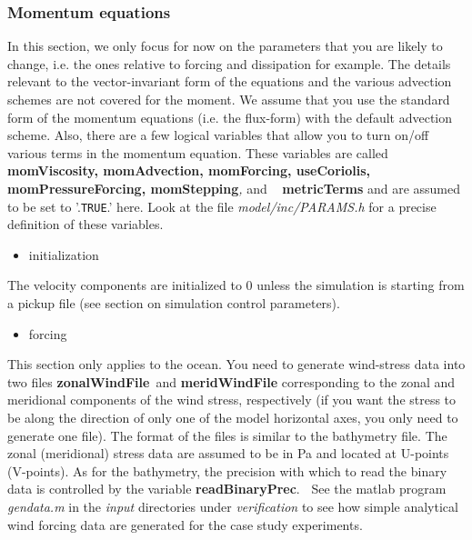 \subsubsection{Momentum equations}

In this section, we only focus for now on the parameters that you are likely
to change, i.e. the ones relative to forcing and dissipation for example.
The details relevant to the vector-invariant form of the equations and the
various advection schemes are not covered for the moment. We assume that you
use the standard form of the momentum equations (i.e. the flux-form) with
the default advection scheme. Also, there are a few logical variables that
allow you to turn on/off various terms in the momentum equation. These
variables are called \textbf{momViscosity, momAdvection, momForcing,
useCoriolis, momPressureForcing, momStepping}\textit{, }and \textit{\ }%
\textbf{metricTerms }and are assumed to be set to '.\texttt{TRUE}.' here.
Look at the file \textit{model/inc/PARAMS.h }for a precise definition of
these variables.

\begin{itemize}
\item initialization
\end{itemize}

The velocity components are initialized to 0 unless the simulation is
starting from a pickup file (see section on simulation control parameters).

\begin{itemize}
\item forcing
\end{itemize}

This section only applies to the ocean. You need to generate wind-stress
data into two files \textbf{zonalWindFile}\textit{\ }and \textbf{%
meridWindFile }corresponding to the zonal and meridional components of the
wind stress, respectively (if you want the stress to be along the direction
of only one of the model horizontal axes, you only need to generate one
file). The format of the files is similar to the bathymetry file. The zonal
(meridional) stress data are assumed to be in Pa and located at U-points
(V-points). As for the bathymetry, the precision with which to read the
binary data is controlled by the variable \textbf{readBinaryPrec}.\textbf{\ }
See the matlab program \textit{gendata.m }in the \textit{input }directories
under \textit{verification }to see how simple analytical wind forcing data
are generated for the case study experiments. 


